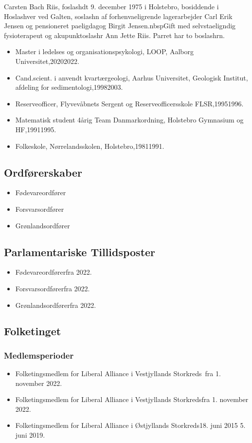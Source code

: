 \documentclass[11pt, a4paper]{awesome-cv}
\begin{document}
\makecvheader[R]
\makelettertitle
\begin{cvletter}
Carsten Bach Riis, foslashdt 9. december 1975 i Holstebro, bosiddende i Hoslashver ved Galten, soslashn af forhenvaeligrende lagerarbejder Carl Erik Jensen og pensioneret paeligdagog Birgit Jensen.nbspGift med selvstaeligndig fysioterapeut og akupunktoslashr Ann Jette Riis. Parret har to boslashrn.

\begin{itemize}
\item Master i ledelses og organisationspsykologi, LOOP, Aalborg Universitet,20202022.
\item Cand.scient. i anvendt kvartærgeologi, Aarhus Universitet, Geologisk Institut, afdeling for sedimentologi,19982003.
\item Reserveofficer, Flyvevåbnets Sergent og Reserveofficersskole FLSR,19951996.
\item Matematisk student 4årig Team Danmarkordning, Holstebro Gymnasium og HF,19911995.
\item Folkeskole, Nørrelandsskolen, Holstebro,19811991.
\end{itemize}
\subsection*{Ordførerskaber}
\begin{itemize}
\item Fødevareordfører
\item Forsvarsordfører
\item Grønlandsordfører
\end{itemize}
\subsection*{Parlamentariske Tillidsposter}
\begin{itemize}
\item Fødevareordførerfra 2022.
\item Forsvarsordførerfra 2022.
\item Grønlandsordførerfra 2022.
\end{itemize}
\subsection*{Folketinget}
\subsubsection*{Medlemsperioder}
\begin{itemize}
\item Folketingsmedlem for Liberal Alliance i Vestjyllands Storkreds fra 1. november 2022.
\item Folketingsmedlem for Liberal Alliance i Vestjyllands Storkredsfra 1. november 2022.
\item Folketingsmedlem for Liberal Alliance i Østjyllands Storkreds18. juni 2015  5. juni 2019.
\end{itemize}

\end{cvletter}
\end{document}
